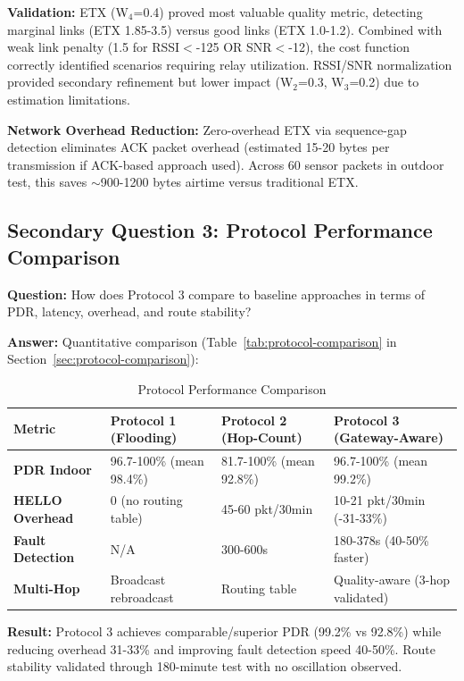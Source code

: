 \textbf{Validation:} ETX (W$_4$=0.4) proved most valuable quality metric, detecting marginal links (ETX 1.85-3.5) versus good links (ETX 1.0-1.2). Combined with weak link penalty (1.5 for RSSI$<$-125 OR SNR$<$-12), the cost function correctly identified scenarios requiring relay utilization. RSSI/SNR normalization provided secondary refinement but lower impact (W$_2$=0.3, W$_3$=0.2) due to estimation limitations.

\textbf{Network Overhead Reduction:} Zero-overhead ETX via sequence-gap detection eliminates ACK packet overhead (estimated 15-20 bytes per transmission if ACK-based approach used). Across 60 sensor packets in outdoor test, this saves $\sim$900-1200 bytes airtime versus traditional ETX.

\subsection{Secondary Question 3: Protocol Performance Comparison}

\textbf{Question:} How does Protocol 3 compare to baseline approaches in terms of PDR, latency, overhead, and route stability?

\textbf{Answer:} Quantitative comparison (Table~\ref{tab:protocol-comparison} in Section~\ref{sec:protocol-comparison}):

\begin{table}[h]
\centering
\caption{Protocol Performance Comparison}
\label{tab:protocol-comparison-discussion}
\begin{tabular}{p{3.5cm}p{3cm}p{3cm}p{3.5cm}}
\hline
\textbf{Metric} & \textbf{Protocol 1 (Flooding)} & \textbf{Protocol 2 (Hop-Count)} & \textbf{Protocol 3 (Gateway-Aware)} \\
\hline
\textbf{PDR Indoor} & 96.7-100\% (mean 98.4\%) & 81.7-100\% (mean 92.8\%) & 96.7-100\% (mean 99.2\%) \\
\hline
\textbf{HELLO Overhead} & 0 (no routing table) & 45-60 pkt/30min & 10-21 pkt/30min (-31-33\%) \\
\hline
\textbf{Fault Detection} & N/A & 300-600s & 180-378s (40-50\% faster) \\
\hline
\textbf{Multi-Hop} & Broadcast rebroadcast & Routing table & Quality-aware (3-hop validated) \\
\hline
\end{tabular}
\end{table}

\textbf{Result:} Protocol 3 achieves comparable/superior PDR (99.2\% vs 92.8\%) while reducing overhead 31-33\% and improving fault detection speed 40-50\%. Route stability validated through 180-minute test with no oscillation observed.

